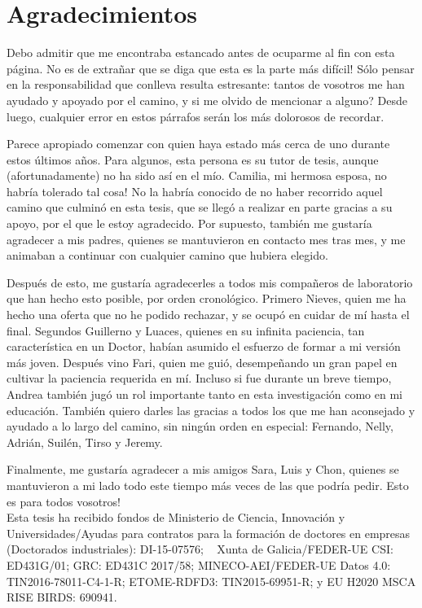 \chapter*{Agradecimientos}
Debo admitir que me encontraba estancado antes de ocuparme al fin con esta p\'agina. \textexclamdown No es de extra\~nar que se diga que esta es la parte m\'as dif\'icil! S\'olo pensar en la responsabilidad que conlleva resulta estresante: tantos de vosotros me han ayudado y apoyado por el camino, \textquestiondown y si me olvido de mencionar a alguno? Desde luego, cualquier error en estos p\'arrafos ser\'an los m\'as dolorosos de recordar.

Parece apropiado comenzar con quien haya estado m\'as cerca de uno durante estos \'ultimos a\~nos. Para algunos, esta persona es su tutor de tesis, aunque (afortunadamente) no ha sido as\'i en el m\'io. \textexclamdown Camilia, mi hermosa esposa, no habr\'ia tolerado tal cosa! No la habr\'ia conocido de no haber recorrido aquel camino que culmin\'o en esta tesis, que se lleg\'o a realizar en parte gracias a su apoyo, por el que le estoy agradecido. Por supuesto, tambi\'en me gustar\'ia agradecer a mis padres, quienes se mantuvieron en contacto mes tras mes, y me animaban a continuar con cualquier camino que hubiera elegido.

Despu\'es de esto, me gustar\'ia agradecerles a todos mis compa\~neros de laboratorio que han hecho esto posible, por orden cronol\'ogico. Primero Nieves, quien me ha hecho una oferta que no he podido rechazar, y se ocup\'o en cuidar de m\'i hasta el final. Segundos Guillerno y Luaces, quienes en su infinita paciencia, tan caracter\'istica en un Doctor, hab\'ian asumido el esfuerzo de formar a mi versi\'on m\'as joven. Despu\'es vino Fari, quien me gui\'o, desempe\~nando un gran papel en cultivar la paciencia requerida en m\'i. Incluso si fue durante un breve tiempo, Andrea tambi\'en jug\'o un rol importante tanto en esta investigaci\'on como en mi educaci\'on. Tambi\'en quiero darles las gracias a todos  los que me han aconsejado y ayudado a lo largo del camino, sin ning\'un orden en especial: Fernando, Nelly, Adri\'an, Suil\'en, Tirso y Jeremy.

Finalmente, me gustar\'ia agradecer a mis amigos Sara, Luis y Chon, quienes se mantuvieron a mi lado todo este tiempo m\'as veces de las que podr\'ia pedir. \textexclamdown Esto es para todos vosotros!\\

\small{Esta tesis ha recibido fondos de Ministerio de Ciencia, Innovaci\'on y Universidades/Ayudas para contratos para la formaci\'on de doctores en empresas (Doctorados industriales): DI-15-07576; ~  Xunta de Galicia/FEDER-UE CSI: ED431G/01; GRC: ED431C 2017/58; MINECO-AEI/FEDER-UE Datos 4.0: TIN2016-78011-C4-1-R; ETOME-RDFD3: TIN2015-69951-R; y EU H2020 MSCA RISE BIRDS: 690941.}